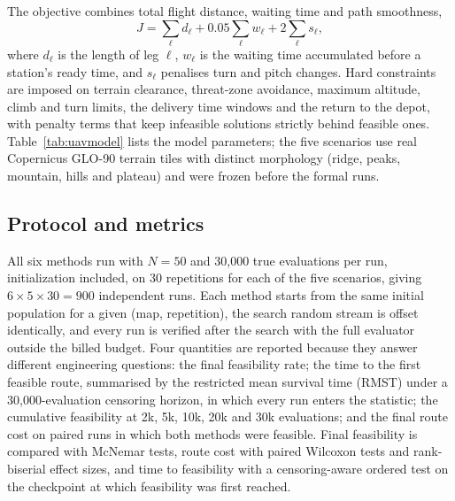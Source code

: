 \documentclass[11pt,a4paper]{article}
\begin{document}
The objective combines total flight distance, waiting time and path
smoothness,
\begin{equation}
\label{eq:uavobj}
J=\sum_{\ell} d_\ell+0.05\sum_{\ell} w_\ell+2\sum_{\ell} s_\ell ,
\end{equation}
where $d_\ell$ is the length of leg $\ell$, $w_\ell$ is the waiting time
accumulated before a station's ready time, and $s_\ell$ penalises turn and
pitch changes. Hard constraints are imposed on terrain clearance, threat-zone
avoidance, maximum altitude, climb and turn limits, the delivery time windows
and the return to the depot, with penalty terms that keep infeasible solutions
strictly behind feasible ones. Table~\ref{tab:uavmodel} lists the model
parameters; the five scenarios use real Copernicus GLO-90 terrain tiles with
distinct morphology (ridge, peaks, mountain, hills and plateau) and were frozen
before the formal runs.

\begin{table}[t]
\centering
\small
\caption{Parameters of the 3D UAV delivery benchmark (benchmark-v1). The
benchmark is a normalized simulation derived from real terrain data, not a
flight test.}
\label{tab:uavmodel}
\resizebox{\linewidth}{!}{}
\end{table}

\subsection{Protocol and metrics}
All six methods run with $N=50$ and 30{,}000 true evaluations per run,
initialization included, on 30 repetitions for each of the five scenarios,
giving $6\times5\times30=900$ independent runs. Each method starts from the
same initial population for a given (map, repetition), the search random
stream is offset identically, and every run is verified after the search with
the full evaluator outside the billed budget. Four quantities are reported
because they answer different engineering questions: the final feasibility
rate; the time to the first feasible route, summarised by the restricted mean
survival time (RMST) under a 30{,}000-evaluation censoring horizon, in which
every run enters the statistic; the cumulative feasibility at 2k, 5k, 10k, 20k
and 30k evaluations; and the final route cost on paired runs in which both
methods were feasible. Final feasibility is compared with McNemar tests,
route cost with paired Wilcoxon tests and rank-biserial effect sizes, and time
to feasibility with a censoring-aware ordered test on the checkpoint at which
feasibility was first reached.
\end{document}
